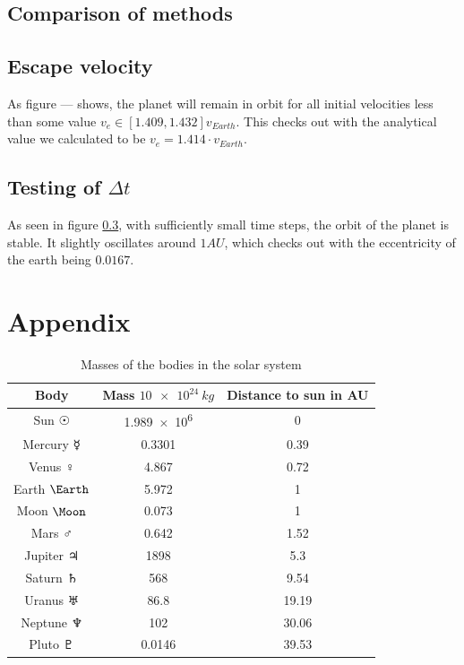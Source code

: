 \documentclass[10pt]{article}
\begin{document}
\begin{multicols}{2}


\subsection{Comparison of methods}

\subsection{Escape velocity}
As figure --- shows, the planet will remain in orbit for all initial velocities less than some value $v_e \in [1.409,1.432]v_{Earth}$. This checks out with the analytical value we calculated to be $v_e = 1.414\cdot v_{Earth}$.



\subsection{Testing of $\Delta t$}
As seen in figure \cref{}, with sufficiently small time steps, the orbit
of the planet is stable. It slightly oscillates around $1AU$, which checks
out with the eccentricity of the earth being $0.0167$.



\section*{Appendix}
\begin{table}[H]
    \caption{Masses of the bodies in the solar system}
    \centering
    \begin{tabular}{| c | c | c | }
        \hline
        Body & Mass $\SI{10e24}{kg}$ & Distance to sun in AU\\
        \hline
        Sun      $\Sun$   & \SI{1.989e6}{}&  0 \\
        Mercury  $\Mercury$ & 0.3301    &  0.39 \\
        Venus    $\Venus$   & 4.867     &  0.72 \\
        Earth    $\Earth$   & 5.972     &  1 \\
        Moon     $\Moon$    & 0.073     &  1 \\
        Mars     $\Mars$    & 0.642     &  1.52 \\
        Jupiter  $\Jupiter$ & 1898      &  5.3 \\
        Saturn   $\Saturn$  & 568       &  9.54 \\
        Uranus   $\Uranus$  & 86.8      & 19.19 \\
        Neptune  $\Neptune$ & 102       & 30.06 \\
        Pluto    $\Pluto$   & 0.0146    & 39.53 \\
        \hline
    \end{tabular}
    \label{tab:CelestialMasses}
\end{table}


{}


\end{multicols}
\end{document}
